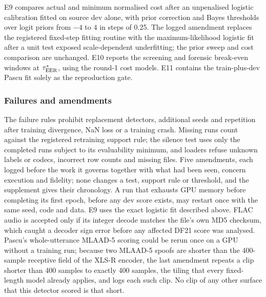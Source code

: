 E9 compares actual and minimum normalised cost after an unpenalised logistic calibration fitted
on source dev alone, with prior correction and Bayes thresholds over logit priors from \(-4\) to
\(4\) in steps of 0.25. The logged amendment replaces the registered fixed-step fitting routine
with the maximum-likelihood logistic fit after a unit test exposed scale-dependent underfitting;
the prior sweep and cost comparison are unchanged. E10 reports the screening and forensic
break-even windows at \(\tau^{*}_{\mathrm{EER}}\), using the round-1 cost models. E11 contains the train-plus-dev
Pascu fit solely as the reproduction gate.

\subsubsection{Failures and amendments}
The failure rules prohibit replacement detectors, additional seeds and repetition after training
divergence, NaN loss or a training crash. Missing runs count against the registered retraining
support rule; the silence test uses only the completed runs subject to its evaluability minimum, and
loaders refuse unknown labels or codecs, incorrect row counts and missing files. Five amendments, each
logged before the work it governs together with what had been seen, concern execution and fidelity;
none changes a test, support rule or threshold, and the supplement gives their chronology. A run that
exhausts GPU memory before completing its first epoch, before any dev score exists, may restart once
with the same seed, code and data. E9 uses the exact logistic fit described above. FLAC audio is
accepted only if its integer decode matches the file's own MD5 checksum, which caught a decoder sign
error before any affected DF21 score was analysed. Pascu's whole-utterance MLAAD-5 scoring could be
rerun once on a GPU without a training run; because two MLAAD-5 spoofs are shorter than the
400-sample receptive field of the XLS-R encoder, the last amendment repeats a clip shorter than 400
samples to exactly 400 samples, the tiling that every fixed-length model already applies, and logs
each such clip. No clip of any other surface that this detector scored is that short.
